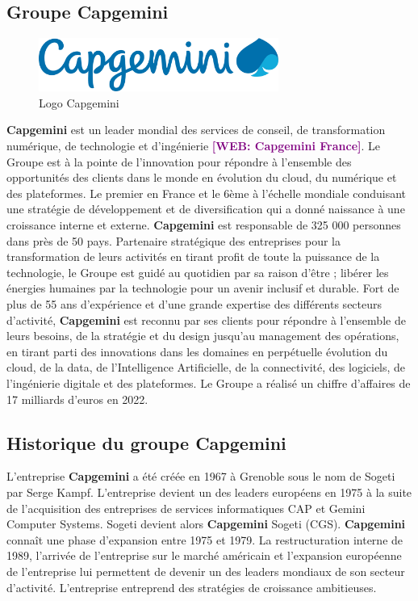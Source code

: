 \documentclass[12pt,a4paper,twoside,openright]{report}
\newcommand{\webref}[1]{\textcolor{purple}{\textbf{[WEB: #1]}}}
\begin{document}
\subsection{Groupe Capgemini}

\begin{figure}[htbp]
    \centering
    \includegraphics[width=0.7\textwidth]{latex_media/media/image3.png}
    \caption{Logo Capgemini}
    \label{fig:logo-capgemini}
\end{figure}

\textbf{Capgemini} est un leader mondial des services de conseil, de transformation numérique, de technologie et d'ingénierie \webref{Capgemini France}. Le Groupe est à la pointe de l'innovation pour répondre à l'ensemble des opportunités des clients dans le monde en évolution du cloud, du numérique et des plateformes. Le premier en France et le 6ème à l'échelle mondiale conduisant une stratégie de développement et de diversification qui a donné naissance à une croissance interne et externe. \textbf{Capgemini} est responsable de
325 000 personnes dans près de 50 pays. Partenaire stratégique des
entreprises pour la transformation de leurs activités en tirant profit
de toute la puissance de la technologie, le Groupe est guidé au
quotidien par sa raison d'être ; libérer les énergies humaines par la
technologie pour un avenir inclusif et durable. Fort de plus de 55 ans
d'expérience et d'une grande expertise des différents secteurs
d'activité, \textbf{Capgemini} est reconnu par ses clients pour répondre
à l'ensemble de leurs besoins, de la stratégie et du design jusqu'au
management des opérations, en tirant parti des innovations dans les
domaines en perpétuelle évolution du cloud, de la data, de
l'Intelligence Artificielle, de la connectivité, des logiciels, de
l'ingénierie digitale et des plateformes. Le Groupe a réalisé un chiffre
d'affaires de 17 milliards d'euros en 2022.

\subsection{Historique du groupe Capgemini}

L'entreprise \textbf{Capgemini} a été créée en 1967 à Grenoble sous le
nom de Sogeti par Serge Kampf. L'entreprise devient un des leaders
européens en 1975 à la suite de l'acquisition des entreprises de
services informatiques CAP et Gemini Computer Systems. Sogeti devient
alors \textbf{Capgemini} Sogeti (CGS). \textbf{Capgemini} connaît une
phase d'expansion entre 1975 et 1979. La restructuration interne de
1989, l'arrivée de l'entreprise sur le marché américain et l'expansion
européenne de l'entreprise lui permettent de devenir un des leaders
mondiaux de son secteur d'activité. L'entreprise entreprend des
stratégies de croissance ambitieuses.
\end{document}
